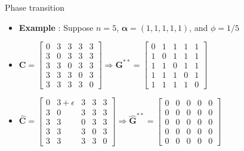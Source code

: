 \documentclass[10pt,dvipdfmx]{beamer}
\begin{document}
\begin{frame}{Phase transition}
\begin{itemize}
    \item {\bf{Example}} : Suppose $n=5$, $\bm{\alpha} = (1, 1, 1, 1, 1)$, and $\phi = 1/5$
    \item $\bm{C} = \left[
            \begin{array}{ccccc}
                0 & 3 & 3 & 3 & 3 \\
                3 & 0 & 3 & 3 & 3 \\
                3 & 3 & 0 & 3 & 3 \\
                3 & 3 & 3 & 0 & 3  \\
                3 & 3 & 3 & 3 & 0
            \end{array} \right] \Rightarrow \bm{G}^{**} = \left[
            \begin{array}{ccccc}
                0 & 1 & 1 & 1 & 1 \\
                1 & 0 & 1 & 1 & 1 \\
                1 & 1 & 0 & 1 & 1 \\
                1 & 1 & 1 & 0 & 1 \\
                1 & 1 & 1 & 1 & 0
            \end{array} \right]$
    \item $\bm{\hat{C}} = \left[
            \begin{array}{ccccc}
                0 & 3 + \epsilon & 3 & 3 & 3 \\
                3 & 0 & 3 & 3 & 3 \\
                3 & 3 & 0 & 3 & 3 \\
                3 & 3 & 3 & 0 & 3  \\
                3 & 3 & 3 & 3 & 0
            \end{array} \right] \Rightarrow \bm{\hat{G}}^{**} = \left[
            \begin{array}{ccccc}
                0 & 0 & 0 & 0 & 0 \\
                0 & 0 & 0 & 0 & 0 \\
                0 & 0 & 0 & 0 & 0 \\
                0 & 0 & 0 & 0 & 0 \\
                0 & 0 & 0 & 0 & 0
            \end{array} \right]$
\end{itemize}
\end{frame}
\end{document}
